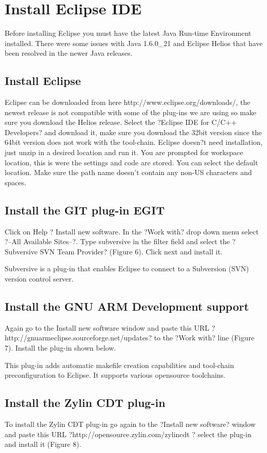 \documentclass[12pt,a4paper]{article}
\begin{document}
\section{Install Eclipse IDE}
Before installing Eclipse you must have the latest Java Run-time Environment installed. There were some issues with Java 1.6.0\_21 and Eclipse Helios that have been resolved in the newer Java releases.

\subsection{Install Eclipse}
Eclipse can be downloaded from here http://www.eclipse.org/downloads/, the newest release is not compatible with some of the plug-ins we are using so make sure you download the Helios release. Select the ?Eclipse IDE for C/C++ Developers? and download it, make sure you download the 32bit version since the 64bit version does not work with the tool-chain. Eclipse doesn?t need installation, just unzip in a desired location and run it. You are prompted for workspace location, this is were the settings and code are stored. You can select the default location. Make sure the path name doesn't contain any non-US characters and spaces. 

\subsection{Install the GIT plug-in EGIT}
Click on Help ? Install new software. In the ?Work with? drop down menu select ?--All Available Sites--?. Type subversive in the filter field and select the ?Subversive SVN Team Provider? (Figure 6). Click next and install it.

Subversive is a plug-in that enables Eclipse to connect to a Subversion (SVN) version control server.

\subsection{Install the GNU ARM Development support}
Again go to the Install new software window and paste this URL ?http://gnuarmeclipse.sourceforge.net/updates? to the ?Work with?  line (Figure 7). Install the plug-in shown below.

This plug-in adds automatic makefile creation capabilities and tool-chain preconfiguration  to Eclipse. It supports various opensource toolchains.
\subsection{Install the Zylin CDT plug-in}
To install the Zylin CDT plug-in go again to the  ?Install new software? window and paste this URL   ?http://opensource.zylin.com/zylincdt ? select the plug-in and install it (Figure 8).
\end{document}
